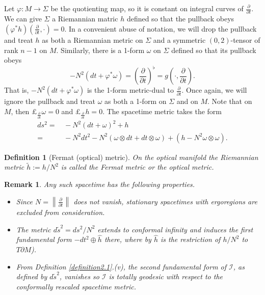 \documentclass[12pt]{amsart}
\numberwithin{equation}{section}
\newtheorem{remark}[theorem]{Remark}
\newtheorem{definition}[theorem]{Definition}
\begin{document}
Let $\varphi:M\to \Sigma$ be the quotienting map, so it is constant on integral curves of $\frac{\partial}{\partial t}$. We can give $\Sigma$ a Riemannian matric $h$ defined so that the pullback obeys $\left (\varphi^* h\right )\left ( \frac{\partial}{\partial t}, \cdot \right )=0$. In a convenient abuse of notation, we will drop the pullback and treat $h$ as both a Riemannian metric on $\Sigma$ and a symmetric $(0,2)$-tensor of rank $n-1$ on $M$. Similarly, there is a 1-form $\omega$ on $\Sigma$ defined so that its pullback obeys
$$-N^2\left ( dt+\varphi^*\omega\right )=\left ( \frac{\partial}{\partial t}\right )^{\flat}=g\left ( \cdot, \frac{\partial}{\partial t}\right ) .$$
That is, $-N^2\left ( dt+\varphi^*\omega\right )$ is the 1-form metric-dual to $\frac{\partial}{\partial t}$. Once again, we will ignore the pullback and treat $\omega$ as both a 1-form on $\Sigma$ and on $M$. Note that on $M$, then $\pounds_{\frac{\partial}{\partial t}}\omega=0$ and $\pounds_{\frac{\partial}{\partial t}}h=0$. The spacetime metric takes the form
\begin{equation}
\label{eq2.1}
\begin{split}
ds^2 =&\, -N^2 \left ( dt+\omega\right )^2 +h\\
=&\,-N^2dt^2-N^2\left ( \omega\otimes dt +dt\otimes\omega\right )+\left ( h-N^2\omega\otimes\omega\right ) .
\end{split}
\end{equation}

\begin{definition}[Fermat (optical) metric]\label{definition2.5}
On the optical manifold the Riemannian metric ${\tilde h}:=h/N^2$ is called the \emph{Fermat metric} or the \emph{optical metric}.
\end{definition}

\begin{remark}\label{remark2.6}
Any such spacetime has the following properties.
\begin{itemize}
\item [i)] Since $N=\left \| \frac{\partial}{\partial t}\right \|$ does not vanish, stationary spacetimes with ergoregions are excluded from consideration.
\item [ii)] The metric $d{\tilde s}^2=ds^2/N^2$ extends to conformal infinity and induces the first fundamental form $-dt^2\oplus {\hat h}$ there, where by ${\hat h}$ is the restriction of $h/N^2$ to $T{\partial M}$).
\item [iii)] From Definition \ref{definition2.1}{\rm{.(v)}}, the second fundamental form of ${\mathcal I}$, as defined by $d{\tilde s}^2$, vanishes so ${\mathcal I}$ is totally geodesic with respect to the conformally rescaled spacetime metric.
\end{itemize}
\end{remark}
\end{document}

